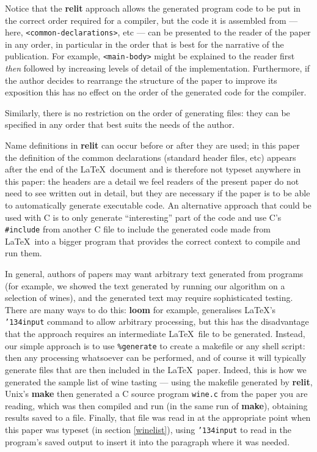 \documentclass[12pt]{article}
\def\name#1{\textbf{#1}}
\begin{document}
Notice that the \name{relit} approach allows the generated program code to be put in the correct order required for a compiler, but the code it is assembled from --- here, \verb|<common-declarations>|, etc --- can be presented to the reader of the paper in any order, in particular in the order that is best for the narrative of the publication. For example, \verb|<main-body>| might be explained to the reader first \emph{then\/} followed by increasing levels of detail of the implementation. Furthermore, if the author decides to rearrange the structure of the paper to improve its exposition this has no effect on the order of the generated code for the compiler.

Similarly, there is no restriction on the order of generating files: they can be specified in any order that best suits the needs of the author.  

Name definitions in \name{relit} can occur before or after they are used; in this paper the definition of the common declarations (standard header files, etc) appears after the end of the \LaTeX\ document and is therefore not typeset anywhere in this paper: the headers are a detail we feel readers of the present paper do not need to see written out in detail, but they are necessary if the paper is to be able to automatically generate executable code. An alternative approach that could be used with C is to only generate ``interesting'' part of the code and use C's \texttt{\#include} from another C file to include the generated code made from \LaTeX\ into a bigger program that provides the correct context to compile and run them.

In general, authors of papers may want arbitrary text generated from programs (for example, we showed the text generated by running our algorithm on a selection of wines), and the generated text may require sophisticated testing. There are many ways to do this: \name{loom} for example, generalises \LaTeX's \texttt{\char'134input} command to allow arbitrary processing, but this has the disadvantage that the approach requires an intermediate \LaTeX\ file to be generated. Instead, our simple approach is to use \texttt{\%{}generate} to create a makefile or any shell script: then any processing whatsoever can be performed, and of course it will typically generate files that are then included in the \LaTeX\ paper. Indeed, this is how we generated the sample list of wine tasting --- using the makefile generated by \name{relit}, Unix's \name{make} then generated a C source program \texttt{wine.c} from the paper you are reading, which was then compiled and run (in the same run of \name{make}), obtaining results saved to a file. Finally, that file was read in at the appropriate point when this paper was typeset (in section \ref{winelist}), using \texttt{\char'134input} to read in the program's saved output to insert it into the paragraph where it was needed. 
\end{document}
